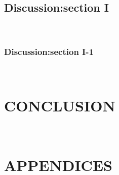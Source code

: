 \documentclass[doctor]{snuee}
\begin{document}
\section{Discussion:section I}
\lipsum[1-4]~\cite{anderson1964hard}

\subsection{Discussion:section I-1}
\lipsum[1-4]~\cite{anderson1964hard}

\chapter{CONCLUSION}
\lipsum[1-4]~\cite{anderson1964hard}

\chapter{APPENDICES}
\lipsum[1-4]~\cite{anderson1964hard}





	
	
	
	
\end{document}
